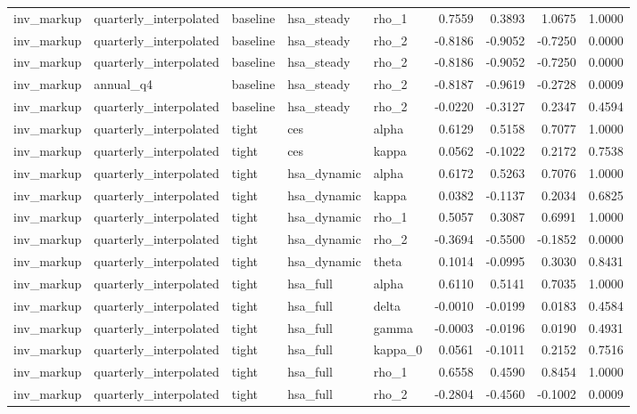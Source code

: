 \begin{tabular}{lllllrrrr}
inv\_markup & quarterly\_interpolated & baseline & hsa\_steady & rho\_1 & 0.7559 & 0.3893 & 1.0675 & 1.0000 \\
inv\_markup & quarterly\_interpolated & baseline & hsa\_steady & rho\_2 & -0.8186 & -0.9052 & -0.7250 & 0.0000 \\
inv\_markup & quarterly\_interpolated & baseline & hsa\_steady & rho\_2 & -0.8186 & -0.9052 & -0.7250 & 0.0000 \\
inv\_markup & annual\_q4 & baseline & hsa\_steady & rho\_2 & -0.8187 & -0.9619 & -0.2728 & 0.0009 \\
inv\_markup & quarterly\_interpolated & baseline & hsa\_steady & rho\_2 & -0.0220 & -0.3127 & 0.2347 & 0.4594 \\
inv\_markup & quarterly\_interpolated & tight & ces & alpha & 0.6129 & 0.5158 & 0.7077 & 1.0000 \\
inv\_markup & quarterly\_interpolated & tight & ces & kappa & 0.0562 & -0.1022 & 0.2172 & 0.7538 \\
inv\_markup & quarterly\_interpolated & tight & hsa\_dynamic & alpha & 0.6172 & 0.5263 & 0.7076 & 1.0000 \\
inv\_markup & quarterly\_interpolated & tight & hsa\_dynamic & kappa & 0.0382 & -0.1137 & 0.2034 & 0.6825 \\
inv\_markup & quarterly\_interpolated & tight & hsa\_dynamic & rho\_1 & 0.5057 & 0.3087 & 0.6991 & 1.0000 \\
inv\_markup & quarterly\_interpolated & tight & hsa\_dynamic & rho\_2 & -0.3694 & -0.5500 & -0.1852 & 0.0000 \\
inv\_markup & quarterly\_interpolated & tight & hsa\_dynamic & theta & 0.1014 & -0.0995 & 0.3030 & 0.8431 \\
inv\_markup & quarterly\_interpolated & tight & hsa\_full & alpha & 0.6110 & 0.5141 & 0.7035 & 1.0000 \\
inv\_markup & quarterly\_interpolated & tight & hsa\_full & delta & -0.0010 & -0.0199 & 0.0183 & 0.4584 \\
inv\_markup & quarterly\_interpolated & tight & hsa\_full & gamma & -0.0003 & -0.0196 & 0.0190 & 0.4931 \\
inv\_markup & quarterly\_interpolated & tight & hsa\_full & kappa\_0 & 0.0561 & -0.1011 & 0.2152 & 0.7516 \\
inv\_markup & quarterly\_interpolated & tight & hsa\_full & rho\_1 & 0.6558 & 0.4590 & 0.8454 & 1.0000 \\
inv\_markup & quarterly\_interpolated & tight & hsa\_full & rho\_2 & -0.2804 & -0.4560 & -0.1002 & 0.0009 \\

\end{tabular}
